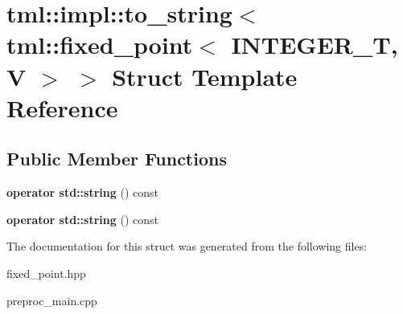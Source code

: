 \hypertarget{structtml_1_1impl_1_1to__string_3_01tml_1_1fixed__point_3_01INTEGER__T_00_01V_01_4_01_4}{\section{tml\+:\+:impl\+:\+:to\+\_\+string$<$ tml\+:\+:fixed\+\_\+point$<$ I\+N\+T\+E\+G\+E\+R\+\_\+\+T, V $>$ $>$ Struct Template Reference}
\label{structtml_1_1impl_1_1to__string_3_01tml_1_1fixed__point_3_01INTEGER__T_00_01V_01_4_01_4}
}
\subsection*{Public Member Functions}
\begin{DoxyCompactItemize}
\item 
\hypertarget{structtml_1_1impl_1_1to__string_3_01tml_1_1fixed__point_3_01INTEGER__T_00_01V_01_4_01_4_a825357c7d5857236a34193093dcc1b2d}{{\bfseries operator std\+::string} () const }\label{structtml_1_1impl_1_1to__string_3_01tml_1_1fixed__point_3_01INTEGER__T_00_01V_01_4_01_4_a825357c7d5857236a34193093dcc1b2d}

\item 
\hypertarget{structtml_1_1impl_1_1to__string_3_01tml_1_1fixed__point_3_01INTEGER__T_00_01V_01_4_01_4_a825357c7d5857236a34193093dcc1b2d}{{\bfseries operator std\+::string} () const }\label{structtml_1_1impl_1_1to__string_3_01tml_1_1fixed__point_3_01INTEGER__T_00_01V_01_4_01_4_a825357c7d5857236a34193093dcc1b2d}

\end{DoxyCompactItemize}


The documentation for this struct was generated from the following files\+:\begin{DoxyCompactItemize}
\item 
fixed\+\_\+point.\+hpp\item 
preproc\+\_\+main.\+cpp\end{DoxyCompactItemize}
